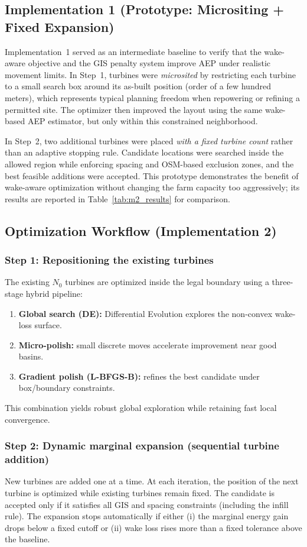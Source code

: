 \documentclass[lettersize,journal]{IEEEtran}
\begin{document}
\subsection{Implementation 1 (Prototype: Micrositing + Fixed Expansion)}
Implementation~1 served as an intermediate baseline to verify that the wake-aware objective and the GIS penalty system improve AEP under realistic movement limits. In Step~1, turbines were \emph{microsited} by restricting each turbine to a small search box around its as-built position (order of a few hundred meters), which represents typical planning freedom when repowering or refining a permitted site. The optimizer then improved the layout using the same wake-based AEP estimator, but only within this constrained neighborhood.

In Step~2, two additional turbines were placed \emph{with a fixed turbine count} rather than an adaptive stopping rule. Candidate locations were searched inside the allowed region while enforcing spacing and OSM-based exclusion zones, and the best feasible additions were accepted. This prototype demonstrates the benefit of wake-aware optimization without changing the farm capacity too aggressively; its results are reported in Table~\ref{tab:m2_results} for comparison.

\subsection{Optimization Workflow (Implementation 2)}
\subsubsection{Step 1: Repositioning the existing turbines}
The existing $N_0$ turbines are optimized inside the legal boundary using a three-stage hybrid pipeline:
\begin{enumerate}
\item \textbf{Global search (DE):} Differential Evolution explores the non-convex wake-loss surface.
\item \textbf{Micro-polish:} small discrete moves accelerate improvement near good basins.
\item \textbf{Gradient polish (L-BFGS-B):} refines the best candidate under box/boundary constraints.
\end{enumerate}
This combination yields robust global exploration while retaining fast local convergence.

\subsubsection{Step 2: Dynamic marginal expansion (sequential turbine addition)}
New turbines are added one at a time. At each iteration, the position of the next turbine is optimized while existing turbines remain fixed. The candidate is accepted only if it satisfies all GIS and spacing constraints (including the infill rule). The expansion stops automatically if either (i) the marginal energy gain drops below a fixed cutoff or (ii) wake loss rises more than a fixed tolerance above the baseline.
\end{document}
